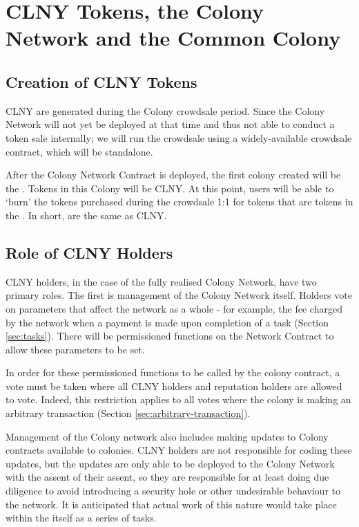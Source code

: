 \section{CLNY Tokens, the Colony Network and the Common Colony}

\subsection{Creation of CLNY Tokens}
CLNY are generated during the Colony crowdsale period. Since the Colony Network will not yet be deployed at that time and thus not able to conduct a token sale internally; we will run the crowdsale using a widely-available crowdsale contract, which will be standalone.

After the Colony Network Contract is deployed, the first colony created will be the \rc. Tokens in this Colony will be CLNY. At this point, users will be able to `burn' the tokens purchased during the crowdsale 1:1 for tokens that are tokens in the \rc. In short, \rcts are the same as CLNY.

\subsection{Role of CLNY Holders}
CLNY holders, in the case of the fully realised Colony Network, have two primary roles. The first is management of the Colony Network itself. Holders vote on parameters that affect the network as a whole - for example, the fee charged by the network when a payment is made upon completion of a task (Section \ref{sec:tasks}). There will be permissioned functions on the Network Contract to allow these parameters to be set. 

In order for these permissioned \rc functions to be called by the colony contract, a vote must be taken where all CLNY holders and reputation holders are allowed to vote. Indeed, this restriction applies to all votes where the colony is making an arbitrary transaction (Section \ref{sec:arbitrary-transaction}).

Management of the Colony network also includes making updates to Colony contracts available to colonies. CLNY holders are not responsible for coding these updates, but the updates are only able to be deployed to the Colony Network with the assent of their assent, so they are responsible for at least doing due diligence to avoid introducing a security hole or other undesirable behaviour to the network. It is anticipated that actual work of this nature would take place within the \rc itself as a series of tasks.

